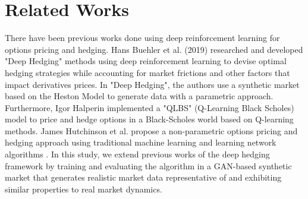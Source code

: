 \section{Related Works}

There have been previous works done using deep reinforcement learning for options pricing and hedging. Hans Buehler et al. (2019) researched and developed "Deep Hedging" \cite{deep-hedging} methods using deep reinforcement learning to devise optimal hedging strategies while accounting for market frictions and other factors that impact derivatives prices. In "Deep Hedging", the authors use a synthetic market based on the Heston Model \cite{heston} to generate data with a parametric approach. Furthermore, Igor Halperin implemented a "QLBS" (Q-Learning Black Scholes) \cite{qlbs} model to price and hedge options in a Black-Scholes world based on Q-learning methods. James Hutchinson et al. propose a non-parametric options pricing and hedging approach using traditional machine learning and learning network algorithms \cite{learning-network}. In this study, we extend previous works of the deep hedging framework by training and evaluating the algorithm in a GAN-based synthetic market that generates realistic market data representative of and exhibiting similar properties to real market dynamics.
